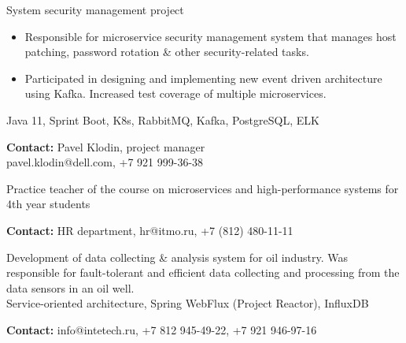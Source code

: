 \documentclass[10pt,a4paper,ragged2e,withhyper]{altacv}
\begin{document}
\begin{paracol}{2}


System security management project
\begin{itemize}
\item Responsible for microservice security management system that manages host patching, password rotation \& other security-related tasks.
\item Participated in designing and implementing new event driven architecture using Kafka. Increased test coverage of multiple microservices.
\end{itemize}
Java 11, Sprint Boot, K8s, RabbitMQ, Kafka, PostgreSQL, ELK

\smallskip

\textbf{Contact:} Pavel Klodin, project manager\\
pavel.klodin@dell.com, +7 921 999-36-38

\divider


Practice teacher of the course on microservices and high-performance systems for 4th year students

\smallskip

\textbf{Contact:} HR department, hr@itmo.ru, +7 (812) 480-11-11


\divider


Development of data collecting \& analysis system for oil industry. Was responsible for fault-tolerant and efficient data collecting and processing from the data sensors in an oil well.\\
Service-oriented architecture, Spring WebFlux (Project Reactor), InfluxDB

\smallskip

\textbf{Contact:} info@intetech.ru, +7 812 945-49-22, +7 921 946-97-16

\divider



\end{paracol}
\end{document}

